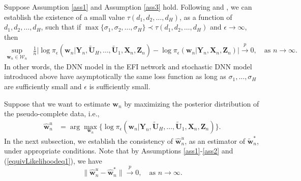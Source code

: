 \documentclass[11pt]{article}
\newcommand{\bX}{{\boldsymbol X}}
\newcommand{\bY}{{\boldsymbol Y}}
\newcommand{\bZ}{{\boldsymbol Z}}
\newcommand{\bw}{{\boldsymbol w}}
\newcommand{\bU}{{\boldsymbol U}}
\begin{document}
Suppose Assumption \ref{ass1} and Assumption \ref{ass3} hold. Following \cite{LiangSLiang2022} and  \cite{SunLiang2022kernel},
we can establish the existence of  
a small value $\tau(d_1,d_2,\ldots,d_H)$,  as a function of $d_1,d_2,\ldots,d_H$, 
such that if $\max\{\sigma_1, \sigma_2, \ldots, \sigma_H\} \prec \tau(d_1,d_2,\ldots,d_H)$ and $\epsilon \to \infty$, then 
\begin{equation} \label{equivLikelihoodeq1}
\begin{split}
\sup_{\bw_n\in \mathcal{W}_n} & \frac{1}{n}\Big| \log \pi_{\epsilon}(\bw_n|\bY_n, \tilde{\bU}_H, \ldots, 
\tilde{\bU}_1,\bX_n, \bZ_n) 
- \log \pi_{\epsilon}(\bw_n|\bY_n,\bX_n,\bZ_n) \Big| \stackrel{p}{\to} 0,   \quad 
\mbox{as $n\to \infty$}.
\end{split}
\end{equation}
In other words, the DNN model in the EFI network and stochastic DNN model introduced above have asymptotically the same loss function as long as $\sigma_1, \ldots,\sigma_H$ are sufficiently small and $\epsilon$ is sufficiently small. 

Suppose that we want to estimate 
$\bw_n$ by maximizing the posterior distribution of the pseudo-complete data, i.e., 
\begin{equation} \label{misseq1}
\begin{split}
\hat{\bw}_{n}^{u} & =\arg\max_{\bw_n}\Big\{\log \pi_{\epsilon} (\bw_n|\bY_n,\tilde{\bU}_H,\ldots, \tilde{\bU}_1,\bX_n, \bZ_n) \Big\}.
\end{split}
\end{equation} 
In the next subsection, we establish the consistency of $\hat{\bw}_n^u$, as an estimator 
of $\tilde{\bw}_n^*$, under appropriate conditions. Note that by Assumptions \ref{ass1}-\ref{ass2} and (\ref{equivLikelihoodeq1}), we  have 
\begin{equation} \label{thetaequiv1}
\|\hat{\bw}_n^u-\hat{\bw}_n^*\|\stackrel{p}{\to} 0, \quad \mbox{as $n\to\infty$}.
\end{equation}
 
\end{document}
